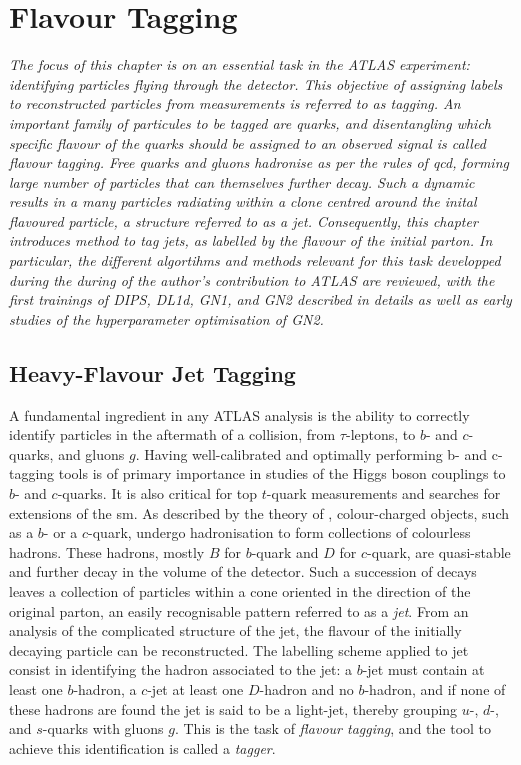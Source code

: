 \chapter{\color{oxfordblue} Flavour Tagging}\label{chap-ftag}
\ChapFrame

\textit{
The focus of this chapter is on an essential task in the ATLAS experiment: identifying particles flying through the detector. This objective of assigning labels to reconstructed particles from measurements is referred to as tagging. An important family of particules to be tagged are quarks, and disentangling which specific flavour of the quarks should be assigned to an observed signal is called flavour tagging. Free quarks and gluons hadronise as per the rules of \gls{qcd}, forming large number of particles that can themselves further decay. Such a dynamic results in a many particles radiating within a clone centred around the inital flavoured particle, a structure referred to as a jet. Consequently, this chapter introduces method to tag jets, as labelled by the flavour of the initial parton. In particular, the different algortihms and methods relevant for this task developped during the during of the author's contribution to ATLAS are reviewed, with the first trainings of DIPS, DL1d, GN1, and GN2 described in details as well as early studies of the hyperparameter optimisation of GN2.
}

\section{Heavy-Flavour Jet Tagging}
A fundamental ingredient in any ATLAS analysis is the ability to correctly identify particles in the aftermath of a collision, from $\tau$-leptons, to $b$- and $c$-quarks, and gluons $g$. Having well-calibrated and optimally performing b- and c-tagging tools is of primary importance in studies of the Higgs boson couplings to $b$- and $c$-quarks. It is also critical for top $t$-quark measurements and searches for extensions of the \gls{sm}. As described by the theory of , colour-charged objects, such as a $b$- or a $c$-quark, undergo hadronisation to form collections of colourless hadrons. These hadrons, mostly $B$ for $b$-quark and $D$ for $c$-quark, are quasi-stable and further decay in the volume of the detector. Such a succession of decays leaves a collection of particles within a cone oriented in the direction of the original parton, an easily recognisable pattern referred to as a \textit{jet}. From an analysis of the complicated structure of the jet, the flavour of the initially decaying particle can be reconstructed. The labelling scheme applied to jet consist in identifying the hadron associated to the jet: a $b$-jet must contain at least one $b$-hadron, a $c$-jet at least one $D$-hadron and no $b$-hadron, and if none of these hadrons are found the jet is said to be a light-jet, thereby grouping $u$-, $d$-, and $s$-quarks with gluons $g$. This is the task of \textit{flavour tagging}, and the tool to achieve this identification is called a \textit{tagger}. \\

